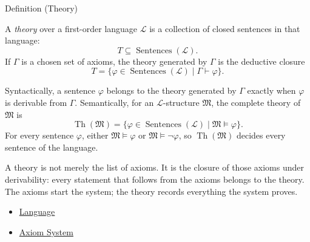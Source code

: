 \begin{definitionbox}{Definition (Theory)}
\begin{definition}[Theory]
\label{def:axiom-systems-theory}
A \emph{theory} over a first-order language $\mathcal{L}$ is a collection of
closed sentences in that language:
\[
  T\subseteq\operatorname{Sentences}(\mathcal{L}).
\]
If $\Gamma$ is a chosen set of axioms, the theory generated by $\Gamma$ is the
deductive closure
\[
  T=\{\varphi\in\operatorname{Sentences}(\mathcal{L})\mid
      \Gamma\vdash\varphi\}.
\]
\end{definition}
\end{definitionbox}

\begin{remark*}
Syntactically, a sentence $\varphi$ belongs to the theory generated by
$\Gamma$ exactly when $\varphi$ is derivable from $\Gamma$. Semantically, for
an $\mathcal{L}$-structure $\mathfrak{M}$, the complete theory of
$\mathfrak{M}$ is
\[
  \operatorname{Th}(\mathfrak{M})
  =\{\varphi\in\operatorname{Sentences}(\mathcal{L})\mid
      \mathfrak{M}\vDash\varphi\}.
\]
For every sentence $\varphi$, either $\mathfrak{M}\vDash\varphi$ or
$\mathfrak{M}\vDash\neg\varphi$, so $\operatorname{Th}(\mathfrak{M})$
decides every sentence of the language.
\end{remark*}

\begin{remark*}[Interpretation]
A theory is not merely the list of axioms. It is the closure of those axioms
under derivability: every statement that follows from the axioms belongs to
the theory. The axioms start the system; the theory records everything the
system proves.
\end{remark*}

\begin{dependencies}
\begin{itemize}
  \item \hyperref[def:language]{Language}
  \item \hyperref[def:axiom-system]{Axiom System}
\end{itemize}
\end{dependencies}

